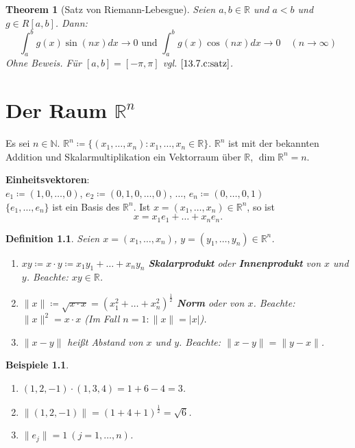 \documentclass[12pt]{extreport} %
\newcommand{\N}{\mathbb{N}}
\newcommand{\R}{\mathbb{R}}
\theoremstyle{named}
\newtheorem{unnamedtheorem}{Theorem} \counterwithin{unnamedtheorem}{chapter}
\theoremstyle{dotless}
\newtheorem*{beispiele}{Beispiele}
\newtheorem*{definition}{Definition}
\begin{document}
\begin{unnamedtheorem}[Satz von Riemann-Lebesgue] \label{13.8:prop-SatzVonRiemann-Lebesgue}
	Seien $a, b \in \R$ und $a < b$ und $g \in R[a, b]$. Dann:
		$$ \int_{a}^{b} g(x) \sin(nx) dx \rightarrow 0 \text{ und } \int_{a}^{b} g(x) \cos(nx) dx \rightarrow 0 \quad (n \rightarrow \infty) $$
		Ohne Beweis. Für $[a, b] = [-\pi, \pi]$ vgl. $\ref{13.7.c:satz}$.
\end{unnamedtheorem}

\newpage

\chapter{\texorpdfstring{Der Raum $\R^{n}$}{Der Raum Rn}}
Es sei $n \in \N$. $\R^{n} \coloneqq \{ (x_{1}, \dotsc, x_{n}) : x_{1}, \dotsc, x_{n} \in \R \}$. $\R^{n}$ ist mit der bekannten Addition und Skalarmultiplikation ein Vektorraum über $\R$, $\dim \R^{n} = n$.

\textbf{Einheitsvektoren}: \\
$e_{1} \coloneqq (1, 0, \dotsc, 0)$, $e_{2} \coloneqq (0, 1, 0, \dotsc, 0)$, $\dotsc$, $e_{n} \coloneqq (0, \dotsc, 0, 1)$ \\
$\{ e_{1}, \dotsc, e_{n} \}$ ist ein Basis des $\R^{n}$. Ist $x = (x_{1}, \dotsc, x_{n}) \in \R^{n}$, so ist
$$ x = x_{1} e_{1} + \dotsc + x_{n} e_{n}. $$

   
\begin{definition}
	Seien $x = (x_{1}, \dotsc, x_{n})$, $y = (y_{1}, \dotsc, y_{n}) \in \R^{n}$.
	\begin{enumerate}
		\item $xy \coloneqq x \cdot y \coloneqq x_{1} y_{1} + \dotsc + x_{n} y_{n}$ \textbf{Skalarprodukt} oder \textbf{Innenprodukt} von $x$ und $y$. Beachte: $xy \in \R$.
		\item $\| x \| \coloneqq \sqrt{x \cdot x} = (x_{1}^{2} + \dotsc + x_{n}^{2})^{\frac{1}{2}}$ \textbf{Norm} oder  von $x$. Beachte: $\|x\|^{2} = x \cdot x$ (Im Fall $n = 1: \|x\| = |x|$).
		\item $\| x - y \|$ hei{\ss}t Abstand von $x$ und $y$. Beachte: $\| x - y \| = \| y - x \|$.
			
	\end{enumerate}
\end{definition}


\begin{beispiele} ~\
	\begin{enumerate}
		\item $(1, 2, -1) \cdot (1, 3, 4) = 1 + 6 - 4 = 3$.
		\item $\| (1, 2, -1) \| = (1 + 4 + 1)^{\frac{1}{2}} = \sqrt{6}$.
		\item $\| e_{j} \| = 1 ~(j = 1, \dotsc, n)$.
	\end{enumerate}
\end{beispiele}
\end{document}
